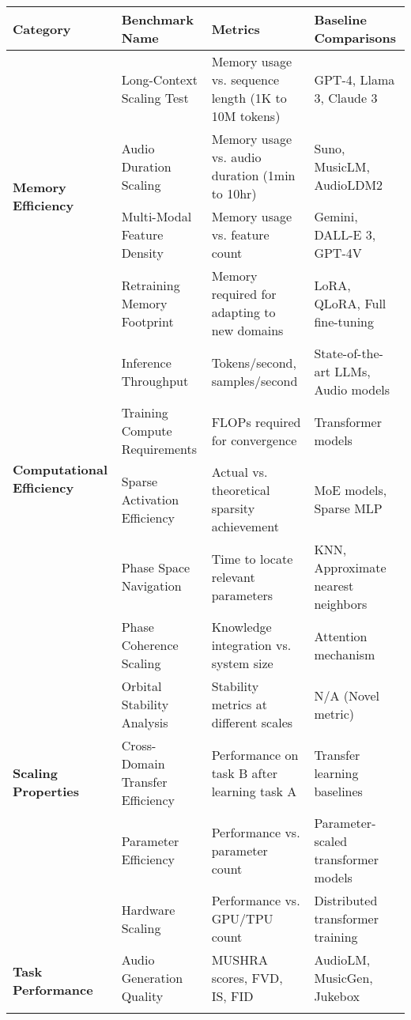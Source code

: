 \begin{table}[h]
\centering
\small
\begin{tabular}{|p{3cm}|p{4cm}|p{4cm}|p{3cm}|}
\hline
\textbf{Category} & \textbf{Benchmark Name} & \textbf{Metrics} & \textbf{Baseline Comparisons} \\
\hline
\multirow{4}{3cm}{\textbf{Memory Efficiency}} & 
Long-Context Scaling Test & Memory usage vs. sequence length (1K to 10M tokens) & GPT-4, Llama 3, Claude 3 \\
\cline{2-4}
& Audio Duration Scaling & Memory usage vs. audio duration (1min to 10hr) & Suno, MusicLM, AudioLDM2 \\
\cline{2-4}
& Multi-Modal Feature Density & Memory usage vs. feature count & Gemini, DALL-E 3, GPT-4V \\
\cline{2-4}
& Retraining Memory Footprint & Memory required for adapting to new domains & LoRA, QLoRA, Full fine-tuning \\
\hline
\multirow{4}{3cm}{\textbf{Computational Efficiency}} & 
Inference Throughput & Tokens/second, samples/second & State-of-the-art LLMs, Audio models \\
\cline{2-4}
& Training Compute Requirements & FLOPs required for convergence & Transformer models \\
\cline{2-4}
& Sparse Activation Efficiency & Actual vs. theoretical sparsity achievement & MoE models, Sparse MLP \\
\cline{2-4}
& Phase Space Navigation & Time to locate relevant parameters & KNN, Approximate nearest neighbors \\
\hline
\multirow{5}{3cm}{\textbf{Scaling Properties}} & 
Phase Coherence Scaling & Knowledge integration vs. system size & Attention mechanism \\
\cline{2-4}
& Orbital Stability Analysis & Stability metrics at different scales & N/A (Novel metric) \\
\cline{2-4}
& Cross-Domain Transfer Efficiency & Performance on task B after learning task A & Transfer learning baselines \\
\cline{2-4}
& Parameter Efficiency & Performance vs. parameter count & Parameter-scaled transformer models \\
\cline{2-4}
& Hardware Scaling & Performance vs. GPU/TPU count & Distributed transformer training \\
\hline
\multirow{6}{3cm}{\textbf{Task Performance}} & 
Audio Generation Quality & MUSHRA scores, FVD, IS, FID & AudioLM, MusicGen, Jukebox \\
\cline{2-4}

\end{tabular}
\end{table}
